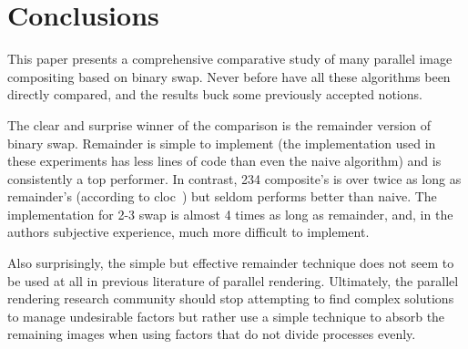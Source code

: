 \documentclass{vgtc}                          %
\newcommand*{\lcite}[1]{~\cite{#1}}
\newcommand{\textalgorithm}[1]{\textsf{#1}\xspace}
\newcommand{\binaryswap}{\textalgorithm{binary swap}}
\newcommand{\ttswap}{\textalgorithm{2-3 swap}}
\newcommand{\naive}{\textalgorithm{naive}}
\newcommand{\remainder}{\textalgorithm{remainder}}
\newcommand{\Remainder}{\textalgorithm{Remainder}}
\newcommand{\ttfcomposite}{\textalgorithm{234 composite}}
\begin{document}
\section{Conclusions}

This paper presents a comprehensive comparative study of many parallel image compositing based on \binaryswap.
Never before have all these algorithms been directly compared, and the results buck some previously accepted notions.

The clear and surprise winner of the comparison is the \remainder version of binary swap.
\Remainder is simple to implement (the implementation used in these experiments has less lines of code than even the \naive algorithm) and is consistently a top performer.
In contrast, \ttfcomposite's is over twice as long as \remainder's (according to cloc\lcite{cloc}) but seldom performs better than \naive.
The implementation for \ttswap is almost 4 times as long as \remainder, and, in the authors subjective experience, much more difficult to implement.

Also surprisingly, the simple but effective \remainder technique does not seem to be used at all in previous literature of parallel rendering.
Ultimately, the parallel rendering research community should stop attempting to find complex solutions to manage undesirable factors but rather use a simple technique to absorb the remaining images when using factors that do not divide processes evenly.


%
%

%
%


\end{document}
